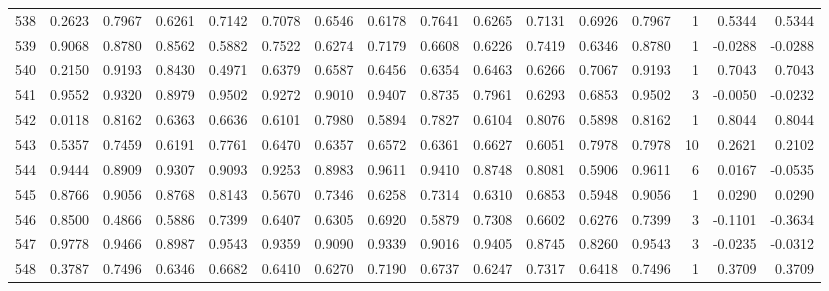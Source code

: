 \begin{tabular}{lrrrrrrrrrrrrrrr}
538 &      0.2623 &  0.7967 &  0.6261 &  0.7142 &  0.7078 &  0.6546 &  0.6178 &  0.7641 &  0.6265 &  0.7131 &   0.6926 &     0.7967 &      1 &                    0.5344 &                     0.5344 \\
539 &      0.9068 &  0.8780 &  0.8562 &  0.5882 &  0.7522 &  0.6274 &  0.7179 &  0.6608 &  0.6226 &  0.7419 &   0.6346 &     0.8780 &      1 &                   -0.0288 &                    -0.0288 \\
540 &      0.2150 &  0.9193 &  0.8430 &  0.4971 &  0.6379 &  0.6587 &  0.6456 &  0.6354 &  0.6463 &  0.6266 &   0.7067 &     0.9193 &      1 &                    0.7043 &                     0.7043 \\
541 &      0.9552 &  0.9320 &  0.8979 &  0.9502 &  0.9272 &  0.9010 &  0.9407 &  0.8735 &  0.7961 &  0.6293 &   0.6853 &     0.9502 &      3 &                   -0.0050 &                    -0.0232 \\
542 &      0.0118 &  0.8162 &  0.6363 &  0.6636 &  0.6101 &  0.7980 &  0.5894 &  0.7827 &  0.6104 &  0.8076 &   0.5898 &     0.8162 &      1 &                    0.8044 &                     0.8044 \\
543 &      0.5357 &  0.7459 &  0.6191 &  0.7761 &  0.6470 &  0.6357 &  0.6572 &  0.6361 &  0.6627 &  0.6051 &   0.7978 &     0.7978 &     10 &                    0.2621 &                     0.2102 \\
544 &      0.9444 &  0.8909 &  0.9307 &  0.9093 &  0.9253 &  0.8983 &  0.9611 &  0.9410 &  0.8748 &  0.8081 &   0.5906 &     0.9611 &      6 &                    0.0167 &                    -0.0535 \\
545 &      0.8766 &  0.9056 &  0.8768 &  0.8143 &  0.5670 &  0.7346 &  0.6258 &  0.7314 &  0.6310 &  0.6853 &   0.5948 &     0.9056 &      1 &                    0.0290 &                     0.0290 \\
546 &      0.8500 &  0.4866 &  0.5886 &  0.7399 &  0.6407 &  0.6305 &  0.6920 &  0.5879 &  0.7308 &  0.6602 &   0.6276 &     0.7399 &      3 &                   -0.1101 &                    -0.3634 \\
547 &      0.9778 &  0.9466 &  0.8987 &  0.9543 &  0.9359 &  0.9090 &  0.9339 &  0.9016 &  0.9405 &  0.8745 &   0.8260 &     0.9543 &      3 &                   -0.0235 &                    -0.0312 \\
548 &      0.3787 &  0.7496 &  0.6346 &  0.6682 &  0.6410 &  0.6270 &  0.7190 &  0.6737 &  0.6247 &  0.7317 &   0.6418 &     0.7496 &      1 &                    0.3709 &                     0.3709 \\

\end{tabular}
